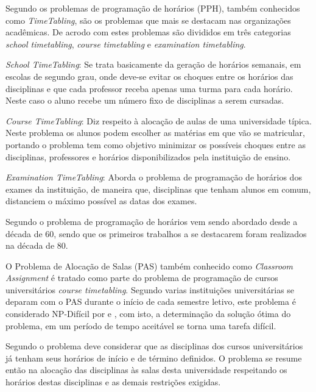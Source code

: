 
Segundo \cite{kripkasimulated} os problemas de programação de horários (PPH), também conhecidos como \textit{TimeTabling}, são os problemas que mais se destacam nas organizações acadêmicas. De acrodo com \cite{schaerf1999survey} estes problemas são divididos em três categorias \textit{school timetabling}, \textit{course timetabling} e \textit{examination timetabling}.\par

\textit{School TimeTabling}: Se trata basicamente da geração de horários semanais, em escolas de segundo grau, onde deve-se evitar os choques entre os horários das disciplinas e que cada professor receba apenas uma turma para cada horário. Neste caso o aluno recebe um número fixo de disciplinas a serem cursadas.\par

\textit{Course TimeTabling}: Diz respeito à alocação de aulas de uma universidade típica. Neste problema os alunos podem escolher as matérias em que vão se matricular, portando o problema tem como objetivo minimizar os possíveis choques entre as disciplinas, professores e horários disponibilizados pela instituição de ensino.\par

\textit{Examination TimeTabling}: Aborda o problema de programação de horários dos exames da instituição, de maneira que, disciplinas que tenham alunos em comum, distanciem o máximo possível as datas dos exames.\par

Segundo \cite{pinheiro2001ambiente} o problema de programação de horários vem sendo abordado desde a década de 60, sendo que os primeiros trabalhos a se destacarem foram realizados na década de 80.\par

O Problema de Alocação de Salas (PAS) também conhecido como \textit{Classroom Assignment} é tratado como parte do problema de programação de cursos universitários \textit{course timetabling}. Segundo \cite{marinho2005heuristicas} varias instituições universitárias se deparam com o PAS durante o início de cada semestre letivo, este problema é considerado NP-Difícil por \cite{even1975complexity} e \cite{carter1992classroom}, com isto, a determinação da solução ótima do problema, em um período de tempo aceitável se torna uma tarefa difícil.\par
Segundo \cite{kripkasimulated} o problema deve considerar que as disciplinas dos cursos universitários já tenham seus horários de início e de término definidos. O problema se resume então na alocação das disciplinas às salas desta universidade respeitando os horários destas disciplinas e as demais restrições exigidas.

